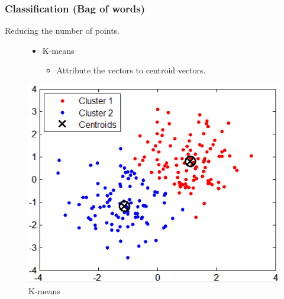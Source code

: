 \documentclass[xcolor=table]{beamer}
\begin{document}
\begin{frame} \frametitle{Classification (Bag of words)}
Reducing the number of points.

\begin{figure}[htbp]
    \begin{minipage}[c]{.55\linewidth}
      \begin{center}
        \begin{itemize}
            \item K-means
            \begin{itemize}
                \item Attribute the vectors to centroid vectors.
            \end{itemize}
        \end{itemize}
      \end{center}
    \end{minipage}
    \hfill
    \begin{minipage}[c]{.40\linewidth}
      \begin{center}
    \includegraphics[scale=0.20]{kmeans.png}
    \caption{K-means}
    \label{fig:kmeans}
      \end{center}
    \end{minipage}
\end{figure}


\end{frame}
\end{document}
